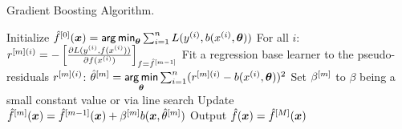 \begin{algorithm}[H]
  \begin{footnotesize}
  \begin{center}
  \caption{Gradient Boosting Algorithm.}
    \begin{algorithmic}[1]
      \State Initialize $\hat{f}^{[0]}(\bm{x}) = \mathop{\sf arg\,min}_{\bm{\theta}} \sum_{i=1}^n L(y^{(i)}, b(x^{(i)}, \bm{\theta}))$
          \State For all $i$: $r^{[m](i)} = -\left[\frac{\partial{L(y^{(i)}, f(x^{(i)}))}}{\partial f(x^{(i)})}\right]_{f=\hat{f}^{[m-1]}}$
        \State Fit a regression base learner to the pseudo-residuals $r^{[m](i)}$:
        \State $\hat{\theta}^{[m]} = \mathop{\sf arg\,min} \limits_{\bm{\theta}} \sum_{i=1}^n (r^{[m](i)} - b(x^{(i)}, \bm{\theta}))^2$
        \State Set $\beta^{[m]}$ to $\beta$ being a small constant value or via line search
        \State Update $\hat{f}^{[m]}(\bm{x}) = \hat{f}^{[m-1]}(\bm{x}) + \beta^{[m]} b(\bm{x}, \hat{\theta}^{[m]})$
      \EndFor
      \State Output $\hat{f}(\bm{x}) = \hat{f}^{[M]}(\bm{x})$
    \end{algorithmic}
    \end{center}
    \end{footnotesize}
\end{algorithm}
